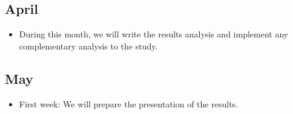 \documentclass[a4paper,12pt]{article}
\begin{document}
\subsection{April}
\begin{itemize}
	\item During this month, we will write the results analysis and implement any complementary analysis to the study.
\end{itemize}
\subsection{May}
\begin{itemize}
	\item First week: We will prepare the presentation of the results.
\end{itemize}
\pagebreak


\end{document}
